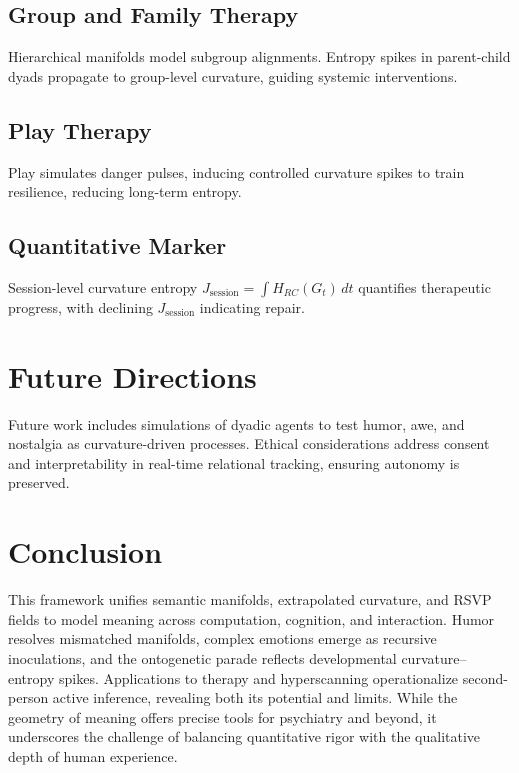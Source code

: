 \documentclass{article}
\theoremstyle{definition}
\begin{document}
\subsection{Group and Family Therapy}
Hierarchical manifolds model subgroup alignments. Entropy spikes in parent-child dyads propagate to group-level curvature, guiding systemic interventions.

\subsection{Play Therapy}
Play simulates danger pulses, inducing controlled curvature spikes to train resilience, reducing long-term entropy.

\subsection{Quantitative Marker}
Session-level curvature entropy $J_{\text{session}} = \int H_{RC}(G_t) \, dt$ quantifies therapeutic progress, with declining $J_{\text{session}}$ indicating repair.

\section{Future Directions}
Future work includes simulations of dyadic agents to test humor, awe, and nostalgia as curvature-driven processes. Ethical considerations address consent and interpretability in real-time relational tracking, ensuring autonomy is preserved.

\section{Conclusion}
This framework unifies semantic manifolds, extrapolated curvature, and RSVP fields to model meaning across computation, cognition, and interaction. Humor resolves mismatched manifolds, complex emotions emerge as recursive inoculations, and the ontogenetic parade reflects developmental curvature–entropy spikes. Applications to therapy and hyperscanning operationalize second-person active inference, revealing both its potential and limits. While the geometry of meaning offers precise tools for psychiatry and beyond, it underscores the challenge of balancing quantitative rigor with the qualitative depth of human experience.



\end{document}
